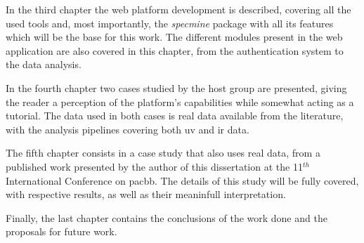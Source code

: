 In the third chapter the web platform development is described, covering all the used tools and, most importantly, the \textit{specmine} package with all its features which will be the base for this work. The different modules present in the web application are also covered in this chapter, from the authentication system to the data analysis.

In the fourth chapter two cases studied by the host group are presented, giving the reader a perception of the platform's capabilities while somewhat acting as a tutorial. The data used in both cases is real data available from the literature, with the analysis pipelines covering both \gls{uv} and \gls{ir} data. 

The fifth chapter consists in a case study that also uses real data, from a published work presented by the author of this dissertation at the 11$^{th}$ International Conference on \acrfull{pacbb}. The details of this study will be fully covered, with respective results, as well as their meaninfull interpretation.

Finally, the last chapter contains the conclusions of the work done and the proposals for future work.



